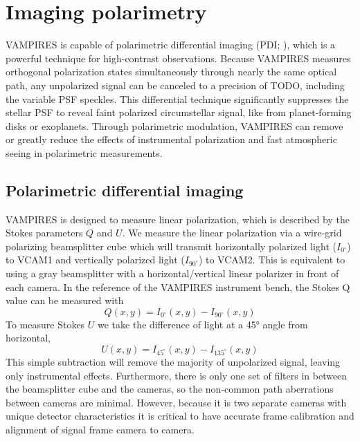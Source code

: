 \section{Imaging polarimetry}\label{sec:polarimetry}

VAMPIRES is capable of polarimetric differential imaging (PDI; \citet{kuhn_imaging_2001}), which is a powerful technique for high-contrast observations. Because VAMPIRES measures orthogonal polarization states simultaneously through nearly the same optical path, any unpolarized signal can be canceled to a precision of TODO, including the variable PSF speckles. This differential technique significantly suppresses the stellar PSF to reveal faint polarized circumstellar signal, like from planet-forming disks or exoplanets. Through polarimetric modulation, VAMPIRES can remove or greatly reduce the effects of instrumental polarization and fast atmospheric seeing in polarimetric measurements.

\subsection{Polarimetric differential imaging}

VAMPIRES is designed to measure linear polarization, which is described by the Stokes parameters $Q$ and $U$. We measure the linear polarization via a wire-grid polarizing beamsplitter cube which will transmit horizontally polarized light ($I_{0^\circ}$) to VCAM1 and vertically polarized light ($I_{90^\circ}$) to VCAM2. This is equivalent to using a gray beamsplitter with a horizontal/vertical linear polarizer in front of each camera. In the reference of the VAMPIRES instrument bench, the Stokes Q value can be  measured with
\begin{equation}
    Q(x, y) = I_{0^\circ}(x, y) - I_{90^\circ}(x,y)
\end{equation}
To measure Stokes $U$ we take the difference of light at a \ang{45} angle from horizontal,
\begin{equation}
    U(x, y) = I_{45^\circ}(x, y) - I_{135^\circ}(x,y)
\end{equation}
This simple subtraction will remove the majority of unpolarized signal, leaving only instrumental effects. Furthermore, there is only one set of filters in between the beamsplitter cube and the cameras, so the non-common path aberrations between cameras are minimal. However, because it is two separate cameras with unique detector characteristics it is critical to have accurate frame calibration and alignment of signal frame camera to camera.

